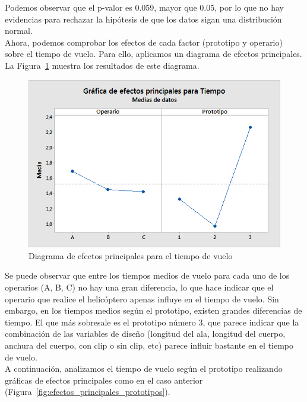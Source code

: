 \documentclass[12pt,a4paper,twoside,openright,titlepage,final]{article}
\begin{document}
Podemos observar que el p-valor es 0.059, mayor que 0.05, por lo que no hay evidencias para rechazar la hipótesis de que los datos sigan una distribución normal.\\

Ahora, podemos comprobar los efectos de cada factor (prototipo y operario) sobre el tiempo de vuelo. Para ello, aplicamos un diagrama de efectos principales. La Figura~\ref{fig:efectos_principales} muestra los resultados de este diagrama.\\

\begin{figure}[htbp!]
	\centering
	\includegraphics[width=0.7\linewidth]{imagenes/Grafica_de_efectos_principales_para_Tiempo}
	\caption{Diagrama de efectos principales para el tiempo de vuelo}
	\label{fig:efectos_principales}
\end{figure}

Se puede observar que entre los tiempos medios de vuelo para cada uno de los operarios (A, B, C) no hay una gran diferencia, lo que hace indicar que el operario que realice el helicóptero apenas influye en el tiempo de vuelo. Sin embargo, en los tiempos medios según el prototipo, existen grandes diferencias de tiempo. El que más sobresale es el prototipo número 3, que parece indicar que la combinación de las variables de diseño (longitud del ala, longitud del cuerpo, anchura del cuerpo, con clip o sin clip, etc) parece influir bastante en el tiempo de vuelo.\\

A continuación, analizamos el tiempo de vuelo según el prototipo realizando gráficas de efectos principales como en el caso anterior (Figura~\ref{fig:efectos_principales_prototipos}).
\end{document}
